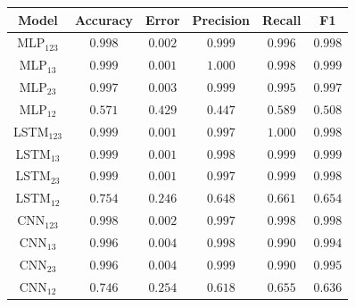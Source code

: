 \documentclass[a4paper,fleqn]{cas-sc}
\begin{document}
\begin{minipage}{0.45\textwidth}
	\begingroup
	\begin{tiny}	
		\setlength{\tabcolsep}{3pt}
		\renewcommand{\arraystretch}{1.15}
		
		
		\begin{tabular*}{\textwidth}{@{} CCCCCC@{} }
			\toprule
			Model&Accuracy&Error&Precision&Recall&F1 \\
			\midrule
				MLP$_{123}$ & $0.998$ & $0.002$ & $0.999$ & $0.996$ & $0.998$ \\
				MLP$_{13}$ & $0.999$ & $0.001$ & $1.000$ & $0.998$ & $0.999$ \\
				MLP$_{23}$ & $0.997$ & $0.003$ & $0.999$ & $0.995$ & $0.997$ \\
				MLP$_{12}$ & $0.571$ & $0.429$ & $0.447$ & $0.589$ & $0.508$ \\
				LSTM$_{123}$ & $0.999$ & $0.001$ & $0.997$ & $1.000$ & $0.998$ \\
				LSTM$_{13}$ & $0.999$ & $0.001$ & $0.998$ & $0.999$ & $0.999$ \\
				LSTM$_{23}$ & $0.999$ & $0.001$ & $0.997$ & $0.999$ & $0.998$ \\
				LSTM$_{12}$ & $0.754$ & $0.246$ & $0.648$ & $0.661$ & $0.654$ \\
				CNN$_{123}$ & $0.998$ & $0.002$ & $0.997$ & $0.998$ & $0.998$ \\
				CNN$_{13}$ & $0.996$ & $0.004$ & $0.998$ & $0.990$ & $0.994$ \\
				CNN$_{23}$ & $0.996$ & $0.004$ & $0.999$ & $0.990$ & $0.995$ \\
				CNN$_{12}$ & $0.746$ & $0.254$ & $0.618$ & $0.655$ & $0.636$ \\    		
			\bottomrule
		\end{tabular*}
		\vspace{-0.3cm}
		\label{tab:metricas_100Mbps_teste}
	\end{tiny}
	\endgroup
\end{minipage}
\end{document}
